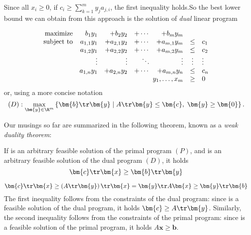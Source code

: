 Since all $x_i\ge0$, if $c_i\ge\sum_{k=1}^my_ja_{j,i}$, the first inequality holds.So the best lower
bound we can obtain from this approach is the solution of {\em dual} linear program

$$
\begin{array}{rrrrrcl}
  {\rm maximize}     & b_1y_1     & + b_2y_2       & + \cdots  & +b_my_m  \\
  {\rm subject\ to} & a_{1,1}y_1 & + a_{2,1}y_2   & + \cdots  & +a_{m,1}y_m  & \le & c_1 \\
                          & a_{1,2}y_1 & + a_{2,2}y_2   & + \cdots  & +a_{m,2}y_m  & \le & c_2 \\
                          &   \vdots   &   \vdots       &   \ddots   &  \vdots      &  \vdots & \vdots\\ 
                          & a_{1,n}y_1 & + a_{2,n}y_2   & + \cdots  & +a_{m,n}y_n  & \le & c_n \\
                          &\multicolumn{4}{r}{y_1,\ldots,x_m}&\ge&0
\end{array}
$$
or, using a more concise notation
$$ (D): \max_{\bm{y}\in\R^m}\left\{ \bm{b}\tr\bm{y} \mid A\tr\bm{y}\le\bm{c},\;\bm{y}\ge\bm{0}\right\}.$$

\noindent
Our musings so far are summarized in the following theorem, known as a {\em weak duality theorem}: 

\begin{veta}\label{thm:weakduality}
  If  is an arbitrary feasible solution of the primal program  $(P)$, and
   is an arbitrary feasible solution of the dual program $(D)$, it holds
$$\bm{c}\tr\bm{x}\ge\bm{b}\tr\bm{y}$$
\end{veta}
\begin{dokaz}
\begin{equation}
\label{eq:weakduality}
\bm{c}\tr\bm{x}\ge\left(A\tr\bm{y}\right)\tr\bm{x}=\bm{y}\tr A\bm{x}\ge\bm{y}\tr\bm{b}
\end{equation}
The first inequality follows from the constraints of the dual program: since  is
a feasible solution of the dual program, it holds $\bm{c}\ge A\tr\bm{y}$.
Similarly, the second inequality follows from the constraints of the primal program: since 
is a feasible solution of the primal program, it holds $A\bm{x}\ge\bm{b}$.
\end{dokaz}

